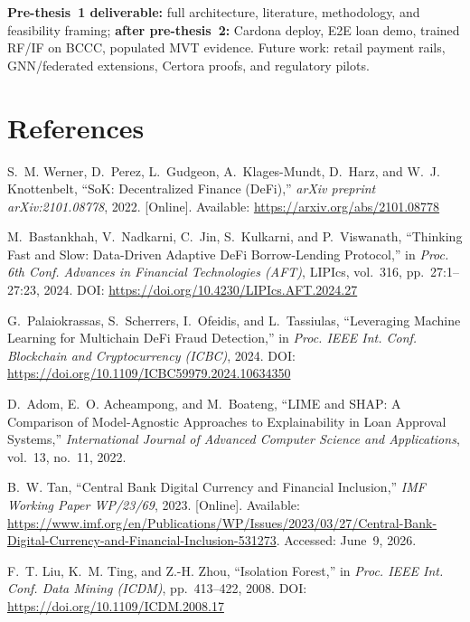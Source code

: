 \documentclass[12pt, a4paper]{report}
\begin{document}
\textbf{Pre-thesis~1 deliverable:} full architecture, literature, methodology, and feasibility framing; \textbf{after pre-thesis~2:} Cardona deploy, E2E loan demo, trained RF/IF on BCCC, populated MVT evidence. Future work: retail payment rails, GNN/federated extensions, Certora proofs, and regulatory pilots.

\chapter*{References}
{}

{\small
\begin{enumerate}[label={[\arabic*]}]
\item S.~M. Werner, D.~Perez, L.~Gudgeon, A.~Klages-Mundt, D.~Harz, and W.~J. Knottenbelt, ``SoK: Decentralized Finance (DeFi),'' \textit{arXiv preprint arXiv:2101.08778}, 2022. [Online]. Available: \url{https://arxiv.org/abs/2101.08778}

\item M.~Bastankhah, V.~Nadkarni, C.~Jin, S.~Kulkarni, and P.~Viswanath, ``Thinking Fast and Slow: Data-Driven Adaptive DeFi Borrow-Lending Protocol,'' in \textit{Proc. 6th Conf. Advances in Financial Technologies (AFT)}, LIPIcs, vol.~316, pp.~27:1--27:23, 2024. DOI: \url{https://doi.org/10.4230/LIPIcs.AFT.2024.27}

\item G.~Palaiokrassas, S.~Scherrers, I.~Ofeidis, and L.~Tassiulas, ``Leveraging Machine Learning for Multichain DeFi Fraud Detection,'' in \textit{Proc. IEEE Int. Conf. Blockchain and Cryptocurrency (ICBC)}, 2024. DOI: \url{https://doi.org/10.1109/ICBC59979.2024.10634350}

\item D.~Adom, E.~O. Acheampong, and M.~Boateng, ``LIME and SHAP: A Comparison of Model-Agnostic Approaches to Explainability in Loan Approval Systems,'' \textit{International Journal of Advanced Computer Science and Applications}, vol.~13, no.~11, 2022.

\item B.~W. Tan, ``Central Bank Digital Currency and Financial Inclusion,'' \textit{IMF Working Paper WP/23/69}, 2023. [Online]. Available: \url{https://www.imf.org/en/Publications/WP/Issues/2023/03/27/Central-Bank-Digital-Currency-and-Financial-Inclusion-531273}. Accessed: June~9, 2026.

\item F.~T. Liu, K.~M. Ting, and Z.-H. Zhou, ``Isolation Forest,'' in \textit{Proc. IEEE Int. Conf. Data Mining (ICDM)}, pp.~413--422, 2008. DOI: \url{https://doi.org/10.1109/ICDM.2008.17}


\end{enumerate}}
\end{document}
